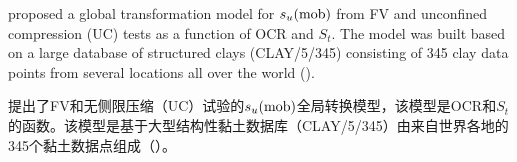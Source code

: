 \begin{ParaColumn}
    \switchcolumn*

    \citet{Ching2012522} proposed a global transformation model for $s_u(\rm{mob})$ from FV and unconfined compression (UC) tests as a function of OCR and $S_t$. The model was built based on a large database of structured clays (CLAY/5/345) consisting of 345 clay data points from several locations all over the world ().

    \switchcolumn

    \citet{Ching2012522}提出了FV和无侧限压缩（UC）试验的$s_u(\rm{mob})$全局转换模型，该模型是OCR和$S_t$的函数。该模型是基于大型结构性黏土数据库（CLAY/5/345）由来自世界各地的345个黏土数据点组成（）。


\end{ParaColumn}